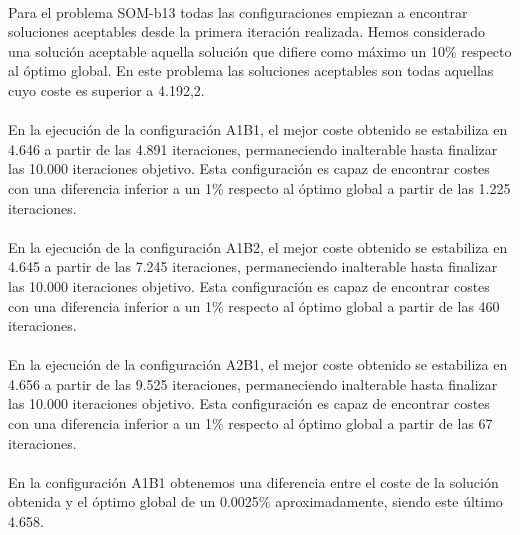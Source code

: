 	\paragraph{}Para el problema SOM-b13 todas las configuraciones empiezan a encontrar soluciones aceptables desde la primera iteración realizada. Hemos considerado una solución aceptable aquella solución que difiere como máximo un 10\% respecto al óptimo global. En este problema las soluciones aceptables son todas aquellas cuyo coste es superior a 4.192,2.
	
	\paragraph{}En la ejecución de la configuración A1B1, el mejor coste obtenido se estabiliza en 4.646 a partir de las 4.891 iteraciones, permaneciendo inalterable hasta finalizar las 10.000 iteraciones objetivo. Esta configuración es capaz de encontrar costes con una diferencia inferior a un 1\% respecto al óptimo global a partir de las 1.225 iteraciones.
	
	\paragraph{}En la ejecución de la configuración A1B2, el mejor coste obtenido se estabiliza en 4.645 a partir de las 7.245 iteraciones, permaneciendo inalterable hasta finalizar las 10.000 iteraciones objetivo. Esta configuración es capaz de encontrar costes con una diferencia inferior a un 1\% respecto al óptimo global a partir de las 460 iteraciones.
	
	\paragraph{}En la ejecución de la configuración A2B1, el mejor coste obtenido se estabiliza en 4.656 a partir de las 9.525 iteraciones, permaneciendo inalterable hasta finalizar las 10.000 iteraciones objetivo. Esta configuración es capaz de encontrar costes con una diferencia inferior a un 1\% respecto al óptimo global a partir de las 67 iteraciones.
	
	\paragraph{}En la configuración A1B1 obtenemos una diferencia entre el coste de la solución obtenida y el óptimo global de un 0.0025\% aproximadamente, siendo este último 4.658.
	
